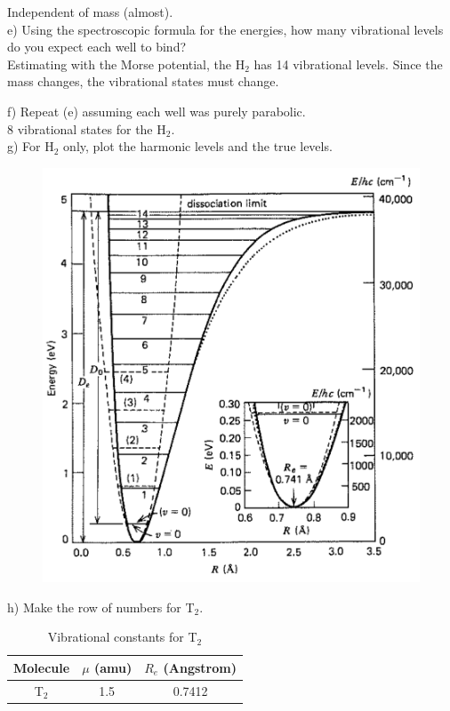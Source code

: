 \documentclass{article}
\begin{document}
{\color{blue} Independent of mass (almost).}
\\

\noindent e) Using the spectroscopic formula for the energies, how many vibrational
levels do you expect each well to bind?
\\

{\color{blue} Estimating with the Morse potential, the H$_2$
  has 14 vibrational levels. Since the mass changes, the vibrational
  states must change.
}

\noindent f) Repeat (e) assuming each well was purely parabolic.
\\

{\color{blue} 8 vibrational states for the H$_2$.}
\\

\noindent g) For H$_2$ only, plot the harmonic levels and the true levels.
\\
\begin{figure}[H]
  \centering
  \includegraphics[scale=0.15]{harmonic_true.png}
\end{figure}

\noindent h) Make the row of numbers for T$_2$.
\begin{table}[H]
  \caption{Vibrational constants for T$_2$}
  \centering
  \begin{tabular}{c|cc}
    Molecule &$\mu$ (amu) & $R_e$ (Angstrom)\\
    \hline
    T$_2$ & 1.5 & 0.7412 \\
  \end{tabular}
\end{table}
\end{document}
